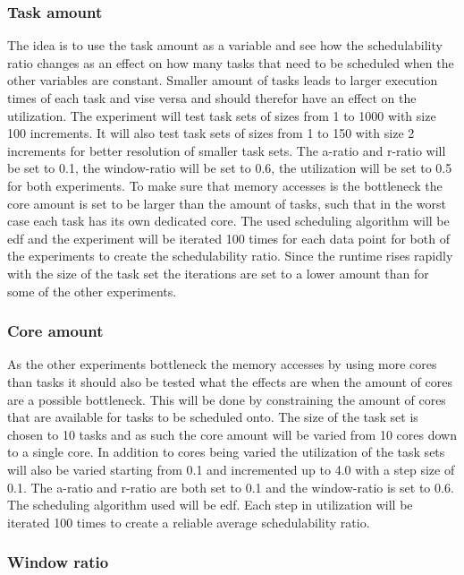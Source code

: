 \documentclass{kththesis}
\begin{document}
\subsubsection{Task amount}

The idea is to use the task amount as a variable and see how the schedulability ratio changes as an
effect on how many tasks that need to be scheduled when the other variables are constant. Smaller amount
of tasks leads to larger execution times of each task and vise versa and should therefor have an
effect on the utilization. The experiment will test task sets of sizes from 1 to 1000 with size 100
increments. It will also test task sets of sizes from 1 to 150 with size 2 increments for better
resolution of smaller task sets. The \acrshort{a}-ratio and \acrshort{r}-ratio will be set to 0.1,
the window-ratio will be set to 0.6, the utilization will be set to 0.5 for both experiments. To
make sure that memory accesses is the bottleneck the core amount is set to be larger than the amount
of tasks, such that in the worst case each task has its own dedicated core. The used scheduling
algorithm will be \acrshort{edf} and the experiment will be iterated 100 times for each data point
for both of the experiments to create the schedulability ratio. Since the runtime rises rapidly
with the size of the task set the iterations are set to a lower amount than for some of the other
experiments.


\subsubsection{Core amount}

As the other experiments bottleneck the memory accesses by using more cores than tasks it should
also be tested what the effects are when the amount of cores are a possible bottleneck. This will be
done by constraining the amount of cores that are available for tasks to be scheduled onto. The
size of the task set is chosen to 10 tasks and as such the core amount will be varied from 10 cores down
to a single core. In addition to cores being varied the utilization of the task sets will also be
varied starting from 0.1 and incremented up to 4.0 with a step size of 0.1. The \acrshort{a}-ratio
and \acrshort{r}-ratio are both set to 0.1 and the window-ratio is set to 0.6. The scheduling
algorithm used will be \acrshort{edf}. Each step in utilization will be iterated 100 times to create
a reliable average schedulability ratio.


\subsubsection{Window ratio}
\end{document}
